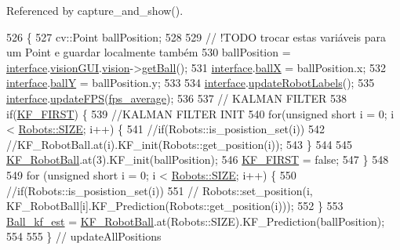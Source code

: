 Referenced by capture\+\_\+and\+\_\+show().


\begin{DoxyCode}
526                                 \{
527     cv::Point ballPosition;
528 
529     \textcolor{comment}{// !TODO trocar estas variáveis para um Point e guardar localmente também}
530     ballPosition = \hyperlink{class_cam_cap_a58002893dfb61307042ddbba0c362dcd}{interface}.\hyperlink{class_v_s_s_s___g_u_i_1_1_v4_l_interface_a7a2432ad62a960423bc3370abe5c8930}{visionGUI}.\hyperlink{class_vision_g_u_i_a36aba058af844ec6cbe0c945c616cd5f}{vision}->\hyperlink{class_vision_a17e19e24cfc7948f646a3cca0488437a}{getBall}();
531     \hyperlink{class_cam_cap_a58002893dfb61307042ddbba0c362dcd}{interface}.\hyperlink{class_v_s_s_s___g_u_i_1_1_v4_l_interface_a41a7395305cf41b91cdadee1f6c4d94b}{ballX} = ballPosition.x;
532     \hyperlink{class_cam_cap_a58002893dfb61307042ddbba0c362dcd}{interface}.\hyperlink{class_v_s_s_s___g_u_i_1_1_v4_l_interface_af81f6cd160e4b1331cbbec6f907c2856}{ballY} = ballPosition.y;
533 
534     \hyperlink{class_cam_cap_a58002893dfb61307042ddbba0c362dcd}{interface}.\hyperlink{class_v_s_s_s___g_u_i_1_1_v4_l_interface_a32c034643a07b5354ad50541413ff08d}{updateRobotLabels}();
535     \hyperlink{class_cam_cap_a58002893dfb61307042ddbba0c362dcd}{interface}.\hyperlink{class_v_s_s_s___g_u_i_1_1_v4_l_interface_a13330b40a7cbd68c2ed4a244f0726810}{updateFPS}(\hyperlink{class_cam_cap_a01f1239b5e2b6478ebda3eac68c35bc1}{fps\_average});
536 
537     \textcolor{comment}{// KALMAN FILTER}
538     \textcolor{keywordflow}{if}(\hyperlink{class_cam_cap_ada660167ec9872e8c91f0e8cf82028f0}{KF\_FIRST}) \{
539         \textcolor{comment}{//KALMAN FILTER INIT}
540         \textcolor{keywordflow}{for}(\textcolor{keywordtype}{unsigned} \textcolor{keywordtype}{short} i = 0; i < \hyperlink{class_robots_ae9df2f1d345ad6740f0459956cdd4712}{Robots::SIZE}; i++) \{
541             \textcolor{comment}{//if(Robots::is\_posistion\_set(i))}
542             \textcolor{comment}{//KF\_RobotBall.at(i).KF\_init(Robots::get\_position(i));}
543         \}
544 
545         \hyperlink{class_cam_cap_abf236d376a111567379a41ae29b3f644}{KF\_RobotBall}.at(3).KF\_init(ballPosition);
546         \hyperlink{class_cam_cap_ada660167ec9872e8c91f0e8cf82028f0}{KF\_FIRST} = \textcolor{keyword}{false};
547     \}
548 
549     \textcolor{keywordflow}{for} (\textcolor{keywordtype}{unsigned} \textcolor{keywordtype}{short} i = 0; i < \hyperlink{class_robots_ae9df2f1d345ad6740f0459956cdd4712}{Robots::SIZE}; i++) \{
550         \textcolor{comment}{//if(Robots::is\_posistion\_set(i))}
551         \textcolor{comment}{//    Robots::set\_position(i, KF\_RobotBall[i].KF\_Prediction(Robots::get\_position(i)));}
552     \}
553     \hyperlink{class_cam_cap_a8e27afe151d46cfbf000fe900ce013b8}{Ball\_kf\_est} = \hyperlink{class_cam_cap_abf236d376a111567379a41ae29b3f644}{KF\_RobotBall}.at(Robots::SIZE).KF\_Prediction(ballPosition);
554 
555 \} \textcolor{comment}{// updateAllPositions}
\end{DoxyCode}
